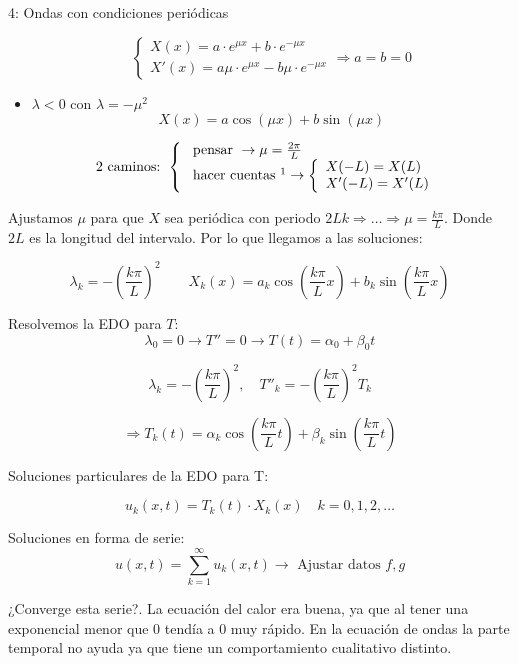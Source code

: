 \begin{example}{4: Ondas con condiciones periódicas}
\begin{itemize}
					\[\begin{cases}
						X(x) = a\cdot e^{\mu x} + b \cdot e^{-\mu x} \\
						X'(x) = a\mu \cdot e^{\mu x} - b \mu \cdot e^{-\mu x}
					\end{cases}
					\Rightarrow a = b = 0 \]


				\item $\lambda < 0$ con $\lambda = -\mu^2$
					\[ X (x) = a \cos (\mu x) + b \sin (\mu x) \]

					\[\text{2 caminos: }\left\{\begin{array}{l}
						\text{ pensar }\rightarrow \mu = \frac{2\pi}{L} \\
						\text{ hacer cuentas }\footnotemark\rightarrow \left\{ \begin{array}{l}
							X(-L) = X(L) \\
							X'(-L) = X'(L)
						\end{array} \right.
					\end{array}
					\right. \]
			\end{itemize}

			Ajustamos $\mu$ para que $X$ sea periódica con periodo $2L k \Rightarrow … \Rightarrow \mu = \frac{k \pi}{L}$. Donde $2L$ es la longitud del intervalo. Por lo que llegamos a las soluciones:

			\[
			\lambda_k = -\left(\frac{k\pi}{L}\right)^2\quad\quad X_k(x) = a_k \cos \left( \frac{k\pi}{L} x \right) + b_k \sin \left( \frac{k\pi}{L} x \right)
			\]

			Resolvemos la EDO para $T$:
			\[ \lambda_0 = 0 \rightarrow T''=0 \rightarrow T(t) = \alpha_0 + \beta_0 t\]

			\[ \lambda_k = - \left( \frac{k\pi}{L} \right)^2, \quad T''_k = - \left( \frac{k\pi}{L} \right)^2 T_k \]

			\[\Rightarrow T_k(t) = \alpha_k \cos \left( \frac{k\pi}{L} t \right) + \beta_k \sin \left( \frac{k\pi}{L} t \right) \]

			Soluciones particulares de la EDO para T:

			\[u_k (x,t) = T_k(t) \cdot X_k(x) \quad k = 0,1,2,… \]


			Soluciones en forma de serie:
			\[u(x,t) = \sum_{k=1}^{\infty} u_k (x,t) \rightarrow \text{ Ajustar datos } f,g \]

			¿Converge esta serie?. La ecuación del calor era buena, ya que al tener una exponencial menor que 0 tendía a 0 muy rápido. En la ecuación de ondas la parte temporal no ayuda ya que tiene un comportamiento cualitativo distinto.


\end{example}
